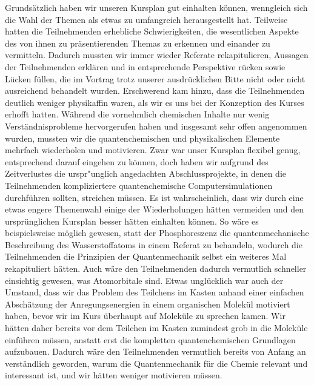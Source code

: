 \documentclass{scrartcl}
\begin{document}
Grunds{\"a}tzlich haben wir unseren Kursplan gut einhalten k{\"o}nnen, wenngleich sich die Wahl der Themen als etwas zu umfangreich herausgestellt hat. Teilweise hatten die Teilnehmenden erhebliche Schwierigkeiten, die wesentlichen Aspekte des von ihnen zu pr{\"a}sentierenden Themas zu erkennen und einander zu vermitteln. Dadurch mussten wir immer wieder Referate rekapitulieren, Aussagen der Teilnehmenden erkl{\"a}ren und in entsprechende Perspektive r{\"u}cken sowie L{\"u}cken f{\"u}llen, die im Vortrag trotz unserer ausdr{\"u}cklichen Bitte nicht oder nicht ausreichend behandelt wurden. Erschwerend kam hinzu, dass die Teilnehmenden deutlich weniger physikaffin waren, als wir es uns bei der Konzeption des Kurses erhofft hatten. W{\"a}hrend die vornehmlich chemischen Inhalte nur wenig Verst{\"a}ndnisprobleme hervorgerufen haben und insgesamt sehr offen angenommen wurden, mussten wir die quantenchemischen und physikalischen Elemente mehrfach wiederholen und motivieren. Zwar war unser Kursplan flexibel genug, entsprechend darauf eingehen zu k{\"o}nnen, doch haben wir aufgrund des Zeitverlustes die urspr{"u}nglich angedachten Abschlussprojekte, in denen die Teilnehmenden kompliziertere quantenchemische Computersimulationen durchf{\"u}hren sollten, streichen m{\"u}ssen. Es ist wahrscheinlich, dass wir durch eine etwas engere Themenwahl einige der Wiederholungen h{\"a}tten vermeiden und den urspr{\"u}nglichen Kursplan besser h{\"a}tten einhalten k{\"o}nnen. So w{\"a}re es beispielsweise m{\"o}glich gewesen, statt der Phosphoreszenz die quantenmechanische Beschreibung des Wasserstoffatoms in einem Referat zu behandeln, wodurch die Teilnehmenden die Prinzipien der Quantenmechanik selbst ein weiteres Mal rekapituliert h{\"a}tten. Auch w{\"a}re den Teilnehmenden dadurch vermutlich schneller einsichtig gewesen, was Atomorbitale sind. Etwas ungl{\"u}cklich war auch der Umstand, dass wir das Problem des Teilchens im Kasten anhand einer einfachen Absch{\"a}tzung der Anregungsenergien in einem organischen Molek{\"u}l motiviert haben, bevor wir im Kurs {\"u}berhaupt auf Molek{\"u}le zu sprechen kamen. Wir h{\"a}tten daher bereits vor dem Teilchen im Kasten zumindest grob in die Molek{\"u}le einf{\"u}hren m{\"u}ssen, anstatt erst die kompletten quantenchemischen Grundlagen aufzubauen. Dadurch w{\"a}re den Teilnehmenden vermutlich bereits von Anfang an verst{\"a}ndlich geworden, warum die Quantenmechanik f{\"u}r die Chemie relevant und interessant ist, und wir h{\"a}tten weniger motivieren m{\"u}ssen.\medskip
\end{document}
